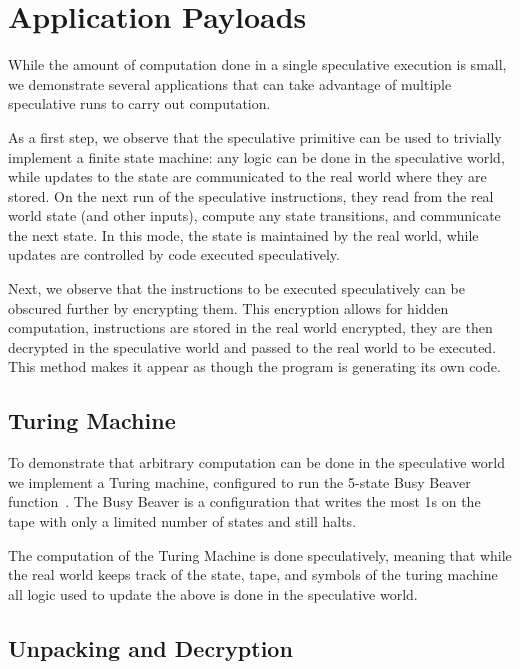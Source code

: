 
\section{Application Payloads}

While the amount of computation done in a single speculative execution is small,
we demonstrate several applications that can take advantage of multiple
speculative runs to carry out computation.

As a first step, we observe that the speculative primitive can be used to trivially
implement a finite state machine: any logic can be done in the speculative
world, while updates to the state are communicated to the real world where they
are stored. On the next run of the speculative instructions, they read from the
real world state (and other inputs), compute any state transitions, and
communicate the next state. In this mode, the state is maintained by the real world,
while updates are controlled by code executed speculatively.

Next, we observe that the instructions to be executed speculatively can be
obscured further by encrypting them. This encryption allows for hidden
computation, instructions are stored in the real world encrypted, they are then
decrypted in the speculative world and passed to the real world to be executed.
This method makes it appear as though the program is generating its own code.

\FigGeneralModel

\subsection{Turing Machine}
\label{subsec:turing}
To demonstrate that arbitrary computation can be done in the speculative world
we implement a Turing machine, configured to run the 5-state Busy Beaver 
function~\cite{chaitin1987computing,herken1992universal}.
The Busy Beaver is a configuration that writes the most
1s on the tape with only a limited number of states and still halts.

The computation of the Turing Machine is done speculatively, meaning that while
the real world keeps track of the state, tape, and symbols of the turing machine
all logic used to update the above is done in the speculative world.

\subsection{Unpacking and Decryption}
\label{subsec:decryption}

